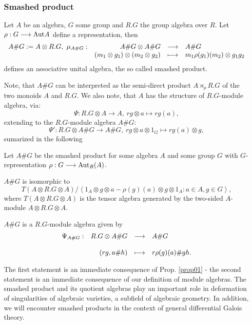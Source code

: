 \subsubsection{Smashed product}
\begin{defi}\label{defi03}
Let $A$ be an algebra, $G$ some group and $R.G$ the group algebra over $R$. Let $\rho : G \longrightarrow \trm{Aut} A$ define a representation, then
$$\bao{rrcl}
A \# G := A \otimes R.G,\ \mu_{A\#G} :& A\#G \otimes A\#G &\longrightarrow& A\#G\\
& (m_1 \otimes g_1) \otimes (m_2 \otimes g_2) &\longmapsto& m_1 \rho(g_1)(m_2) \otimes g_1 g_2\\
\ea$$
defines an associative unital algebra, the so called smashed product.
\end{defi}
Note, that $A\#G$ can be interpreted as the semi-direct product $A \rtimes_\rho R.G$ of the two monoids $A$ and $R.G$. We also note, that $A$ has the structure of $R.G$-module algebra, via:
$$\Psi : R.G \otimes A \longrightarrow A,\ r g \otimes a \longmapsto r g(a),$$
extending to the $R.G$-module algebra $A\#G$:
$$\Psi' : R.G \otimes A\#G \longrightarrow A\#G,\ r g \otimes a \otimes 1_G \longmapsto r g(a) \otimes g,$$
sumarized in the following
\begin{koro}\label{koro01}
Let $A\#G$ be the smashed product for some algebra $A$ and some group $G$ with $G$-representation $\rho : G \longrightarrow \trm{Aut}_R(A)$.
\bn
\item $A\#G$ is isomorphic to 
$$T(A\otimes R.G \otimes A)/\left<1_A \otimes g \otimes a - \rho(g)(a) \otimes g \otimes 1_A: a \in A, g \in G\right>,$$
where $T(A \otimes R.G \otimes A)$ is the tensor algebra generated by the two-sided $A$-module $A \otimes R.G \otimes A$.
\item $A\# G$ is a $R.G$-module algebra given by
$$\bao{rrcl}
\Psi_{A\#G} : &R.G \otimes A\# G &\longrightarrow& A\#G\\
&&&\\
&(r g, a\# h) &\longmapsto&r \rho(g)(a)\# g h.\\
\ea$$
\en
\end{koro}
\bws The first statement is an immediate consequence of Prop. \ref{prop01} - the second statement is an immediate consequence of our definition of module algebras. %
\bmk The smashed product and its quotient algebras play an important role in deformation of singularities of algebraic varieties, a subfield of algebraic geometry. In addition, we will encounter smashed products in the context of general differential Galois theory.
